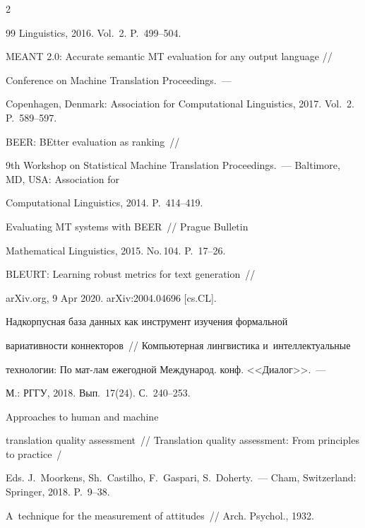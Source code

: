 \begin{multicols}{2}
{{\begin{thebibliography}{99}
Linguistics, 2016. Vol.~2. P.~499--504.




 MEANT 2.0: Accurate semantic MT evaluation for any output language // 


Conference on Machine Translation Proceedings.~---


 Copenhagen, Denmark: Association for Computational Linguistics, 2017. Vol.~2. P.~589--597.




 BEER: BEtter evaluation as ranking~//  


9th Workshop on Statistical Machine Translation Proceedings.~--- Baltimore, MD, USA: Association for 


Computational Linguistics, 2014. P.~414--419.




 Evaluating MT systems with BEER~// Prague Bulletin  


Mathematical Linguistics, 2015. No.\,104. P.~17--26.




 BLEURT: Learning robust metrics for text generation~// 


arXiv.org, 9 Apr 2020. arXiv:2004.04696 [cs.CL].




 Надкорпусная база данных как инструмент изучения формальной 


вариативности коннекторов~// Компьютерная лингвистика и~интеллектуальные 


технологии: По мат-лам ежегодной \mbox{Международ.} конф. <<Диалог>>.~---


 М.: РГГУ, 2018. Вып.~17(24). С.~240--253.




 Approaches to human and machine 


translation quality assessment~// Translation quality assessment: From principles to practice~/ 


Eds. J.~Moorkens, Sh.~Castilho, F.~Gaspari, S.~Doherty.~--- Cham, Switzerland: Springer, 2018.  P.~9--38.




 A~technique for the measurement of attitudes~// Arch. Psychol., 1932. 



\end{thebibliography}}}
\end{multicols}
